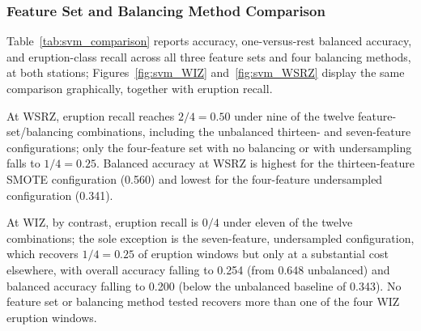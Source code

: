 \documentclass[11pt,a4paper]{article}
\begin{document}
\subsubsection{Feature Set and Balancing Method Comparison}

Table~\ref{tab:svm_comparison} reports accuracy, one-versus-rest balanced accuracy, and eruption-class recall across all three feature sets and four balancing methods, at both stations; Figures~\ref{fig:svm_WIZ} and~\ref{fig:svm_WSRZ} display the same comparison graphically, together with eruption recall.

At WSRZ, eruption recall reaches $2/4=0.50$ under nine of the twelve feature-set/balancing combinations, including the unbalanced thirteen- and seven-feature configurations; only the four-feature set with no balancing or with undersampling falls to $1/4=0.25$. Balanced accuracy at WSRZ is highest for the thirteen-feature SMOTE configuration (0.560) and lowest for the four-feature undersampled configuration (0.341).

At WIZ, by contrast, eruption recall is $0/4$ under eleven of the twelve combinations; the sole exception is the seven-feature, undersampled configuration, which recovers $1/4=0.25$ of eruption windows but only at a substantial cost elsewhere, with overall accuracy falling to 0.254 (from 0.648 unbalanced) and balanced accuracy falling to 0.200 (below the unbalanced baseline of 0.343). No feature set or balancing method tested recovers more than one of the four WIZ eruption windows.
\end{document}
